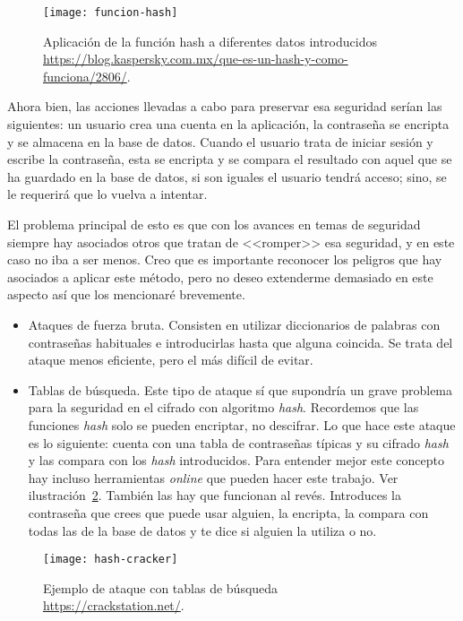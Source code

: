 \begin{figure}[h]
\centering
\texttt{[image: funcion-hash]}
\caption[Aplicación de la función hash a diferentes datos introducidos.]{Aplicación de la función hash a diferentes datos introducidos \url{https://blog.kaspersky.com.mx/que-es-un-hash-y-como-funciona/2806/}.}
\label{fig:3.1}
\end{figure}

Ahora bien, las acciones llevadas a cabo para preservar esa seguridad serían las siguientes: un usuario crea una cuenta en la aplicación, la contraseña se encripta y se almacena en la base de datos. Cuando el usuario trata de iniciar sesión y escribe la contraseña, esta se encripta y se compara el resultado con aquel que se ha guardado en la base de datos, si son iguales el usuario tendrá acceso; sino, se le requerirá que lo vuelva a intentar.

El problema principal de esto es que con los avances en temas de seguridad siempre hay asociados otros que tratan de <<romper>> esa seguridad, y en este caso no iba a ser menos. Creo que es importante reconocer los peligros que hay asociados a aplicar este método, pero no deseo extenderme demasiado en este aspecto así que los mencionaré brevemente.


\begin{itemize}
\item Ataques de fuerza bruta. Consisten en utilizar diccionarios de palabras con contraseñas habituales e introducirlas hasta que alguna coincida. Se trata del ataque menos eficiente, pero el más difícil de evitar.
\item Tablas de búsqueda. Este tipo de ataque sí que supondría un grave problema para la seguridad en el cifrado con algoritmo \emph{hash}. Recordemos que las funciones \emph{hash} solo se pueden encriptar, no descifrar. Lo que hace este ataque es lo siguiente: cuenta con una tabla de contraseñas típicas y su cifrado \emph{hash} y las compara con los \emph{hash} introducidos. Para entender mejor este concepto hay incluso herramientas \emph{online} que pueden hacer este trabajo. Ver ilustración~\ref{fig:3.2}. También las hay que funcionan al revés. Introduces la contraseña que crees que puede usar alguien, la encripta, la compara con todas las de la base de datos y te dice si alguien la utiliza o no.
\end{itemize}

\begin{figure}[h]
\centering
\texttt{[image: hash-cracker]}
\caption[Ejemplo de ataque con tablas de búsqueda.]{Ejemplo de ataque con tablas de búsqueda \url{https://crackstation.net/}.}

\label{fig:3.2}
\end{figure}

